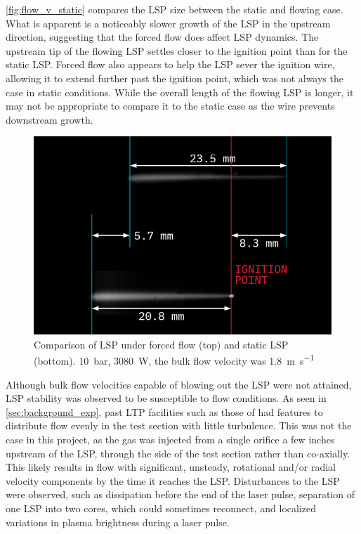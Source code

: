         \autoref{fig:flow_v_static} compares the LSP size between the static and flowing case. What is apparent is a noticeably slower growth of the LSP in the upstream direction, suggesting that the forced flow does affect LSP dynamics. The upstream tip of the flowing LSP settles closer to the ignition point than for the static LSP. Forced flow also appears to help the LSP sever the ignition wire, allowing it to extend further past the ignition point, which was not always the case in static conditions. While the overall length of the flowing LSP is longer, it may not be appropriate to compare it to the static case as the wire prevents downstream growth.

        \begin{figure}[h]
            \centering
            \includegraphics[]{assets/5 results/flow_static_lsp.jpg}
            \caption[Comparison of LSP under forced flow (top) and static LSP (bottom)]{Comparison of LSP under forced flow (top) and static LSP (bottom). \qty{10}{bar}, \qty{3080}{W}, the bulk flow velocity was \qty{1.8}{m.s^{-1}}}
            \label{fig:flow_v_static}
        \end{figure}

        Although bulk flow velocities capable of blowing out the LSP were not attained, LSP stability was observed to be susceptible to flow conditions. As seen in \autoref{sec:background_exp}, past LTP facilities such as those of \textcite{toyodaThrustPerformanceCW2002} had features to distribute flow evenly in the test section with little turbulence. This was not the case in this project, as the gas was injected from a single orifice a few inches upstream of the LSP, through the side of the test section rather than co-axially. This likely results in flow with significant, unsteady, rotational and/or radial velocity components by the time it reaches the LSP. Disturbances to the LSP were observed, such as dissipation before the end of the laser pulse, separation of one LSP into two cores, which could sometimes reconnect, and localized variations in plasma brightness during a laser pulse.

